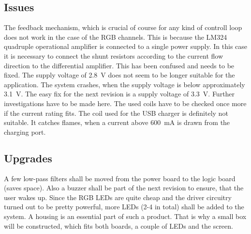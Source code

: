 \subsection{Issues}
\label{subsec:issues_hw}
The feedback mechanism, which is crucial of course for any kind of controll loop
does not work in the case of the RGB channels. This is because the LM324
quadruple operational amplifier is connected to a single power supply. In this
case it is necessary to connect the shunt resistors according to the current
flow direction to the differential amplifier. This has been confused and needs
to be fixed. 
\newpar
The supply voltage of \SI{2.8}{\volt} does not seem to be longer suitable for the
application. The system crashes, when the supply voltage is below approximately
\SI{3.1}{\volt}. The easy fix for the next revision is a supply voltage of
\SI{3.3}{V}. Further investigations have to be made here. 
\newpar
The used coils have to be checked once more if the current rating fits. The coil
used for the USB charger is definitely not suitable. It catches flames, when a current above \SI{600}{\milli\ampere} is drawn from the charging port. 

\subsection{Upgrades}
\label{subsec:upgrades_hw}
A few low-pass filters shall be moved from the power board to the logic board
(saves space). 
\newpar
Also a buzzer shall be part of the next revision to ensure, that the user
wakes up.
\newpar
Since the RGB LEDs are quite cheap and the driver circuitry turned
out to be pretty powerful, more LEDs (2-4 in total) shall be added to the system. 
\newpar
A housing is an essential part of such a product. That is why a small box will
be constructed, which fits both boards, a couple of LEDs and the screen. 

